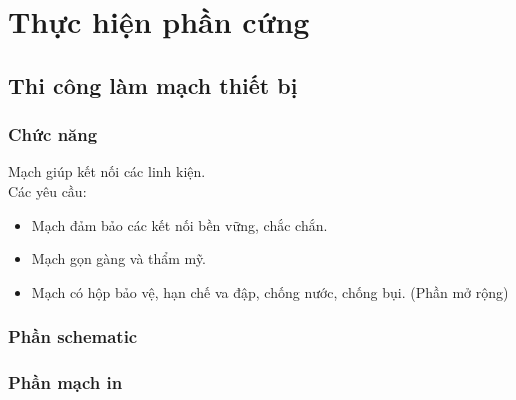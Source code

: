 \section{Thực hiện phần cứng}
\subsection{Thi công làm mạch thiết bị}
\subsubsection{Chức năng}
Mạch giúp kết nối các linh kiện.\\
Các yêu cầu:
\begin{itemize}
\item Mạch đảm bảo các kết nối bền vững, chắc chắn.
\item Mạch gọn gàng và thẩm mỹ.
\item Mạch có hộp bảo vệ, hạn chế va đập, chống nước, chống bụi. (Phần mở rộng)
\end{itemize}
\subsubsection{Phần schematic}
\subsubsection{Phần mạch in}
\label{ref{fig3_1}}
\label{ref{fig3_2}}